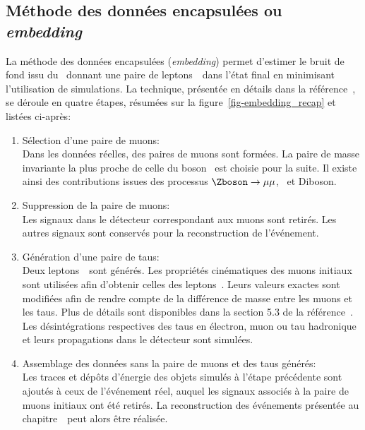 \subsection{Méthode des données encapsulées ou \emph{embedding}}\label{chapter-HTT_analysis-section-bg_estimation-embedding}
La méthode des données encapsulées (\emph{embedding}) permet d'estimer le bruit de fond issu du \SM\ donnant une paire de leptons~\tau\ dans l'état final en minimisant l'utilisation de simulations.
La technique, présentée en détails dans la référence~\cite{embedding}, se déroule en quatre étapes, résumées sur la figure~\ref{fig-embedding_recap} et listées ci-après:
\begin{enumerate}
\item Sélection d'une paire de muons:\\
Dans les données réelles, des paires de muons sont formées.
La paire de masse invariante la plus proche de celle du boson \Zboson\ est choisie pour la suite.
Il existe ainsi des contributions issues des processus $\Zboson\to\mu\mu$, \ttbar\ et Diboson.
\item Suppression de la paire de muons:\\
Les signaux dans le détecteur correspondant aux muons sont retirés.
Les autres signaux sont conservés pour la reconstruction de l'événement.
\item Génération d'une paire de taus:\\
Deux leptons~\tau\ sont générés.
Les propriétés cinématiques des muons initiaux sont utilisées afin d'obtenir celles des leptons~\tau.
Leurs valeurs exactes sont modifiées afin de rendre compte de la différence de masse entre les muons et les taus.
Plus de détails sont disponibles dans la section 5.3 de la référence~\cite{embedding}.
Les désintégrations respectives des taus en électron, muon ou tau hadronique et leurs propagations dans le détecteur sont simulées.
\item Assemblage des données sans la paire de muons et des taus générés:\\
Les traces et dépôts d'énergie des objets simulés à l'étape précédente sont ajoutés à ceux de l'événement réel, auquel les signaux associés à la paire de muons initiaux ont été retirés.
La reconstruction des événements présentée au chapitre~\ peut alors être réalisée.
\end{enumerate}
